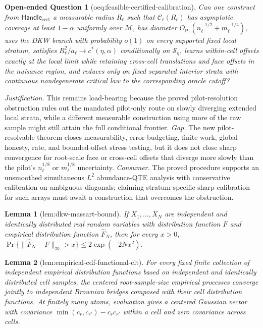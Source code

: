 \documentclass{article}
\newtheorem{lemma}{Lemma}
\newtheorem{openendedquestion}{Open-ended Question}
\begin{document}
\begin{openendedquestion}[oeq:feasible-certified-calibration]\label{oeq:feasible-certified-calibration}
Can one construct from \(\mathsf{Handle}_{\mathrm{cert}}\) a measurable radius \(R_\ell\) such that \(\mathcal C_\ell(R_\ell)\) has asymptotic coverage at least \(1-\alpha\) uniformly over \(\mathcal M\), has diameter \(O_{\Pr}(n_\ell^{-1/2}+m_\ell^{-1/4})\), uses the DKW branch with probability \(o(1)\) on every supported fixed local stratum, satisfies \(R_\ell^2/a_\ell\to c^*(\eta,\alpha)\) conditionally on \(\mathscr S_\eta\), learns within-cell offsets exactly at the local limit while retaining cross-cell translations and face offsets in the nuisance region, and reduces only on fixed separated interior strata with continuous nondegenerate critical law to the corresponding oracle cutoff?
\end{openendedquestion}
\par\smallskip\noindent \textit{Justification.} This remains load-bearing because the proved pilot-resolution obstruction rules out the mandated pilot-only route on slowly diverging extended local strata, while a different measurable construction using more of the raw sample might still attain the full conditional frontier. \textit{Gap.} The new pilot-resolvable theorem closes measurability, error budgeting, finite work, global honesty, rate, and bounded-offset stress testing, but it does not close sharp convergence for root-scale face or cross-cell offsets that diverge more slowly than the pilot's \(n_\ell^{1/8}\) or \(m_\ell^{1/8}\) uncertainty. \textit{Consumer.} The proved procedure supports an unsmoothed simultaneous \(L^2\) abundance-QTE analysis with conservative calibration on ambiguous diagonals; claiming stratum-specific sharp calibration for such arrays must await a construction that overcomes the obstruction.

\begin{lemma}[lem:dkw-massart-bound]\label{lem:dkw-massart-bound}
If \(X_1,\ldots,X_N\) are independent and identically distributed real random variables with distribution function \(F\) and empirical distribution function \(\widehat F_N\), then for every \(x>0\), \(\Pr\{\|\widehat F_N-F\|_\infty>x\}\leq 2\exp(-2Nx^2)\).
\end{lemma}

\begin{lemma}[lem:empirical-cdf-functional-clt]\label{lem:empirical-cdf-functional-clt}
For every fixed finite collection of independent empirical distribution functions based on independent and identically distributed cell samples, the centered root-sample-size empirical processes converge jointly to independent Brownian bridges composed with their cell distribution functions.  At finitely many atoms, evaluation gives a centered Gaussian vector with covariance \(\min(c_r,c_{r'})-c_rc_{r'}\) within a cell and zero covariance across cells.
\end{lemma}
\end{document}
